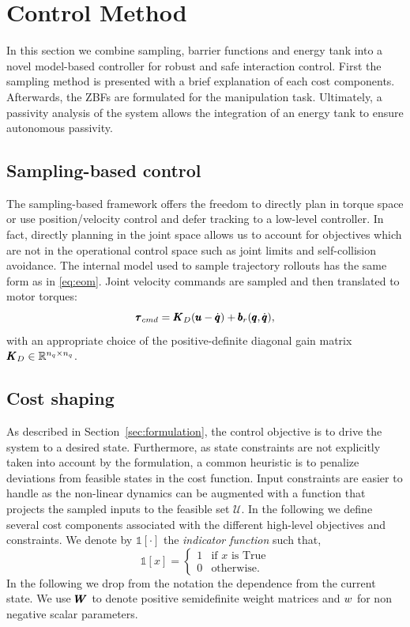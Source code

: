 \section{Control Method} \label{sec:control_method}

In this section we combine sampling, barrier functions and energy tank into a novel model-based controller for robust and safe interaction control. First the sampling method is presented with a brief explanation of each cost components. Afterwards, the ZBFs are formulated for the manipulation task. Ultimately, a passivity analysis of the system allows the integration of an energy tank to ensure autonomous passivity. 

\subsection{Sampling-based control}
The sampling-based framework offers the freedom to directly plan in torque space or use position/velocity control and defer tracking to a low-level controller. In fact, directly planning in the joint space allows us to account for objectives which are not in the operational control space such as joint limits and self-collision avoidance. The internal model used to sample trajectory rollouts has the same form as in \eqref{eq:eom}. Joint velocity commands are sampled and then translated to motor torques:
\begin{equation}
    \pmb{\tau}_{cmd} = \pmb{K}_{D} (\pmb{u} - \dot{\pmb{q}}) + \pmb{b}_{r}(\pmb{q}, \dot{\pmb{q}}),
\end{equation}
with an appropriate choice of the positive-definite diagonal gain matrix $\pmb{K}_{D} \in \mathbb{R}^{n_q\times n_q}$. 

\subsection{Cost shaping}
As described in Section~\ref{sec:formulation}, the control objective is to drive the system to a desired state. Furthermore, as state constraints are not explicitly taken into account by the formulation, a common heuristic is to penalize deviations from feasible states in the cost function. Input constraints are easier to handle as the non-linear dynamics can be augmented with a function that projects the sampled inputs to the feasible set $\mathcal{U}$. In the following we define several cost components associated with the different high-level objectives and constraints.
We denote by $\mathds{1}[\cdot]$ the \textit{indicator function} such that,
\begin{equation}
    \mathds{1}[x] = 
    \begin{cases}
    1 & \text{if } x \text{ is True} \\
    0 & \text{otherwise}.
    \end{cases}
\end{equation}
In the following we drop from the notation the dependence from the current state. We use $\pmb{W}_{}$ to denote positive semidefinite weight matrices and $w_{}$ for non negative scalar parameters. 


